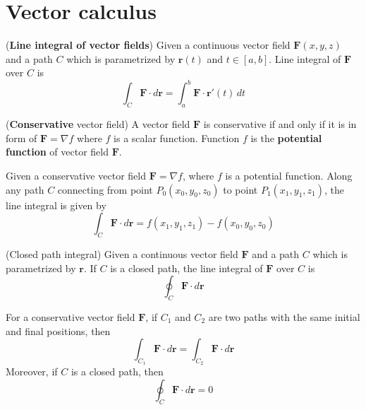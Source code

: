 \documentclass{huhtakm-template-book}
\begin{document}
\chapter{Vector calculus}
\begin{defn}(\textbf{Line integral of vector fields})
    Given a continuous vector field $\mathbf{F}(x,y,z)$ and a path $C$ which is parametrized by $\mathbf{r}(t)$ and $t\in[a,b]$. Line integral of $\mathbf{F}$ over $C$ is
    \begin{equation*}
        \int_{C}\mathbf{F}\cdot d\mathbf{r}=\int_{a}^{b}\mathbf{F}\cdot\mathbf{r}'(t)\,dt
    \end{equation*}
\end{defn}
\begin{defn}(\textbf{Conservative} vector field)
    A vector field $\mathbf{F}$ is conservative if and only if it is in form of $\mathbf{F}=\nabla f$ where $f$ is a scalar function. Function $f$ is the \textbf{potential function} of vector field $\mathbf{F}$.
\end{defn}
\begin{thm}
    Given a conservative vector field $\mathbf{F}=\nabla f$, where $f$ is a potential function. Along any path $C$ connecting from point $P_{0}(x_{0},y_{0},z_{0})$ to point $P_{1}(x_{1},y_{1},z_{1})$, the line integral is given by
    \begin{equation*}
        \int_{C}\mathbf{F}\cdot d\mathbf{r}=f(x_{1},y_{1},z_{1})-f(x_{0},y_{0},z_{0})
    \end{equation*}
\end{thm}
\begin{defn}(Closed path integral)
    Given a continuous vector field $\mathbf{F}$ and a path $C$ which is parametrized by $\mathbf{r}$. If $C$ is a closed path, the line integral of $\mathbf{F}$ over $C$ is
    \begin{equation*}
        \oint_{C}\mathbf{F}\cdot d\mathbf{r}
    \end{equation*}
\end{defn}
\begin{cor}
    For a conservative vector field $\mathbf{F}$, if $C_{1}$ and $C_{2}$ are two paths with the same initial and final positions, then
    \begin{equation*}
        \int_{C_{1}}\mathbf{F}\cdot d\mathbf{r}=\int_{C_{2}}\mathbf{F}\cdot d\mathbf{r}
    \end{equation*}
    Moreover, if $C$ is a closed path, then
    \begin{equation*}
        \oint_{C}\mathbf{F}\cdot d\mathbf{r}=0
    \end{equation*}
\end{cor}
\end{document}
